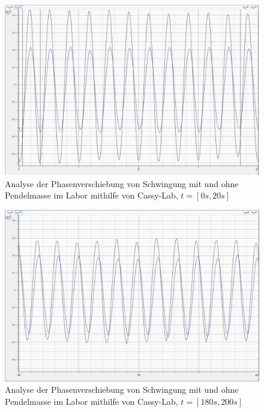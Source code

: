 \begin{figure}[H]
	\centering
	\includegraphics[width=1\textwidth]{phasenverschiebung_cassy_1.png}
	\caption{Analyse der Phasenverschiebung von Schwingung mit und ohne Pendelmasse im Labor mithilfe von Cassy-Lab, $t=[0s,20s]$}
	\label{fig:phasenverschiebung_cassy_1}
\end{figure}
\begin{figure}[H]
	\centering
	\includegraphics[width=1\textwidth]{phasenverschiebung_cassy_2.png}
	\caption{Analyse der Phasenverschiebung von Schwingung mit und ohne Pendelmasse im Labor mithilfe von Cassy-Lab, $t=[180s,200s]$}
	\label{fig:phasenverschiebung_cassy_2}
\end{figure}




